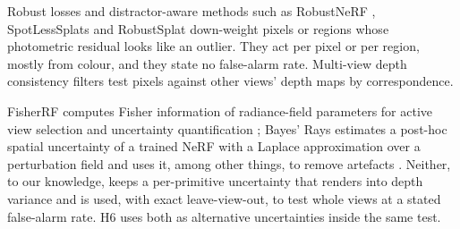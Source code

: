  Robust losses \cite{rob_blackrangarajan,rob_barron}
and distractor-aware methods such as RobustNeRF \cite{gs_robustnerf}, SpotLessSplats
\cite{gs_spotless} and RobustSplat \cite{gs_robustsplat} down-weight pixels or regions whose
photometric residual looks like an outlier. They act per pixel or per region, mostly from colour,
and they state no false-alarm rate. Multi-view depth consistency filters \cite{fus_merrell,fus_colmap_mvs}
test pixels against other views' depth maps by correspondence.

 FisherRF computes Fisher information of radiance-field
parameters for active view selection and uncertainty quantification \cite{unc_fisherrf}; Bayes' Rays
estimates a post-hoc spatial uncertainty of a trained NeRF with a Laplace approximation over a
perturbation field and uses it, among other things, to remove artefacts \cite{unc_bayesrays}. Neither,
to our knowledge, keeps a per-primitive uncertainty that renders into depth variance and is used,
with exact leave-view-out, to test whole views at a stated false-alarm rate. H6 uses both as
alternative uncertainties inside the same test. 
